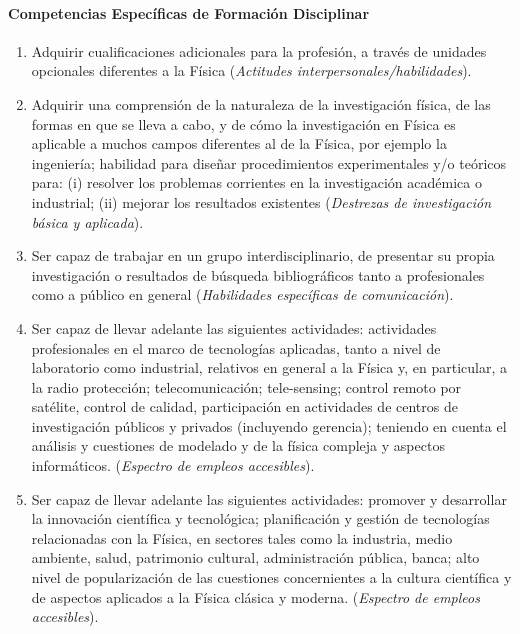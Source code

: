 \paragraph{Competencias Específicas de Formación Disciplinar}

\begin{enumerate}

\item Adquirir cualificaciones adicionales para la profesión, a través de unidades opcionales diferentes a la Física (\emph{Actitudes interpersonales/habilidades}).

\item Adquirir una comprensión de la naturaleza de la investigación física, de las formas en que se lleva a cabo, y de cómo la investigación en Física es aplicable a muchos campos diferentes al de la Física, por ejemplo la ingeniería; habilidad para diseñar procedimientos experimentales y/o teóricos para: (i)
resolver los problemas corrientes en la investigación académica o industrial; (ii) mejorar los resultados existentes (\emph{Destrezas de investigación básica y aplicada}).

\item Ser capaz de trabajar en un grupo interdisciplinario, de presentar su propia investigación o resultados de búsqueda bibliográficos tanto a profesionales como a público en general (\emph{Habilidades específicas de comunicación}).

\item Ser capaz de llevar adelante las siguientes actividades: actividades profesionales en el marco de tecnologías aplicadas, tanto a nivel de laboratorio como industrial, relativos en general a la Física y, en particular, a la radio protección; telecomunicación; tele-sensing; control remoto por satélite,
control de calidad, participación en actividades de centros de investigación públicos y privados (incluyendo gerencia); teniendo en cuenta el análisis y cuestiones de modelado y de la física compleja y aspectos informáticos. (\emph{Espectro de empleos accesibles}).

\item Ser capaz de llevar adelante las siguientes actividades: promover y desarrollar la innovación científica y tecnológica; planificación y gestión de tecnologías relacionadas con la Física, en sectores tales como la industria, medio ambiente, salud, patrimonio cultural, administración pública, banca;
alto nivel de popularización de las cuestiones concernientes a la cultura científica y de aspectos aplicados a la Física clásica y moderna. (\emph{Espectro de empleos accesibles}).


\end{enumerate}
